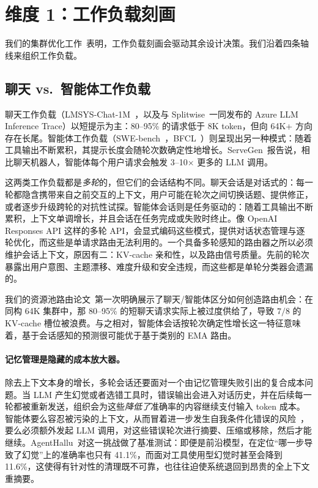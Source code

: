 \section{维度 1：工作负载刻画}
\label{sec:workload}

我们的集群优化工作~\cite{poolrouting2026, fleetopt2026, fleetsim2026}表明，工作负载刻画会驱动其余设计决策。我们沿着四条轴线来组织工作负载。

\subsection{聊天 vs.\ 智能体工作负载}
\label{sec:workload:chat-agent}

聊天工作负载（LMSYS-Chat-1M~\cite{zheng2024lmsys}，以及与 Splitwise~\cite{patel2024splitwise}一同发布的 Azure LLM Inference Trace）以短提示为主：80--95\% 的请求低于 8K token，但向 64K+ 方向存在长尾。智能体工作负载（SWE-bench~\cite{jimenez2024swebench}，BFCL~\cite{patil2025bfcl}）则呈现出另一种模式：随着工具输出不断累积，其提示长度会随轮次数确定性地增长。ServeGen~\cite{servegen2025}报告说，相比聊天机器人，智能体每个用户请求会触发 3--10$\times$ 更多的 LLM 调用。

这两类工作负载都是\emph{多轮}的，但它们的会话结构不同。聊天会话是对话式的：每一轮都隐含携带来自之前交互的上下文，用户可能在轮次之间切换话题、提供修正，或者逐步升级跨轮的对抗性试探。智能体会话则是任务驱动的：随着工具输出不断累积，上下文单调增长，并且会话在任务完成或失败时终止。像 OpenAI Responses API 这样的多轮 API，会显式编码这些模式，提供对话状态管理与逐轮优化，而这些是单请求路由无法利用的。一个具备多轮感知的路由器之所以必须维护会话上下文，原因有二：KV-cache 亲和性，以及路由信号质量。先前的轮次暴露出用户意图、主题漂移、难度升级和安全违规，而这些都是单轮分类器会遗漏的。

我们的资源池路由论文~\cite{poolrouting2026}第一次明确展示了聊天/智能体区分如何创造路由机会：在同构 64K 集群中，那 80--95\% 的短聊天请求实际上被过度供给了，导致 $7/8$ 的 KV-cache 槽位被浪费。与之相对，智能体会话按轮次确定性增长这一特征意味着，基于会话感知的预测很可能优于基于类别的 EMA 路由。

\paragraph{记忆管理是隐藏的成本放大器。}
除去上下文本身的增长，多轮会话还要面对一个由记忆管理失败引出的复合成本问题。当 LLM 产生幻觉或者选错工具时，错误输出会进入对话历史，并在后续每一轮都被重新发送，组织会为这些\emph{降低了}准确率的内容继续支付输入 token 成本。智能体要么容忍被污染的上下文，从而冒着进一步发生自我条件化错误的风险~\cite{driftbench2026}，要么必须额外发起 LLM 调用，对这些错误轮次进行摘要、压缩或移除，然后才能继续。AgentHallu~\cite{agenthallu2026}对这一挑战做了基准测试：即便是前沿模型，在定位“哪一步导致了幻觉”上的准确率也只有 41.1\%，而面对工具使用型幻觉时甚至会降到 11.6\%，这使得有针对性的清理既不可靠，也往往迫使系统退回到昂贵的全上下文重摘要。

